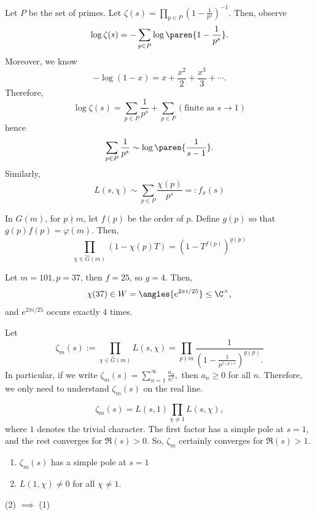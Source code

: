 \begin{rmk}
    Let $P$ be the set of primes. Let $\zeta(s) = \prod_{p \in P} (1-\frac{1}{p^s})^{-1}$. Then, observe
    $$\log \zeta (s) = -\sum_{p \in P}\log \paren{1-\frac{1}{p^s}}.$$
    Moreover, we know
    $$-\log(1-x) = x + \frac{x^2}{2}+\frac{x^3}{3}+\cdots.$$
    Therefore,
    $$\log \zeta (s) = \sum_{p \in P}\frac{1}{p^s}+\sum _{p\in P}(\text{finite as } s \to 1)$$
    hence
    $$\sum_{p \in P}\frac{1}{p^s}\sim \log \paren{\frac{1}{s-1}}.$$
    Similarly,
    $$L(s,\chi) \sim \sum_{p \in P}\frac{\chi(p)}{p^s}=:f_x(s)$$
\end{rmk}

\begin{lem}
    In $G(m)$, for $p \nmid m$, let $f(p)$ be the order of $p$. Define $g(p)$ so that $g(p)f(p)=\varphi (m)$. Then,
    $$\prod _{\chi \in \hat G(m)}(1-\chi(p)T)=(1-T^{f(p)})^{g(p)}$$
\end{lem}

\begin{ex}
    Let $m = 101,p = 37$, then $f=25$, so $g=4$. Then,
    $$\chi (37) \in W = \angles{e^{2\pi i/25}} \leq \C^\times,$$
    and $e^{2\pi i/25}$ occurs exactly $4$ times.
\end{ex}

\begin{defn}
    Let
    $$\zeta_m(s) := \prod_{\chi \in \hat G(m)}L(s,\chi)=\prod_{p \nmid m}\frac{1}{(1-\frac{1}{p^{f(p)s}})^{g(p)}.}$$
    In particular, if we write $\zeta_m(s) = \sum_{n=1}^\infty \frac{a_n}{n^s},$ then $a_n \geq 0$ for all $n$. Therefore, we only need to understand $\zeta_m(s)$ on the real line.
\end{defn}

\begin{prop}
    $$\zeta_m(s) = L(s, 1) \prod_{\chi \neq  1}L(s,\chi),$$
    where $1$ denotes the trivial character. The first factor has a simple pole at $s=1$, and the rest converges for $\Re(s)>0$. So, $\zeta_m$ certainly converges for $\Re(s)>1$.
\end{prop}

\begin{thm}
    \begin{enumerate}
        \item $\zeta_m(s)$ has a simple pole at $s=1$
        \item $L(1,\chi) \neq 0$ for all $\chi \neq  1$.
    \end{enumerate}
    (2) $\implies$ (1)
\end{thm}

